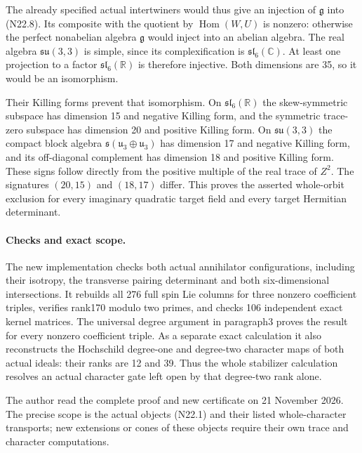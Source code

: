 The already specified actual intertwiners would thus give an
injection of $\mathfrak g$ into (N22.8). Its composite with
the quotient by $\operatorname{Hom}(W,U)$ is nonzero: otherwise
the perfect nonabelian algebra $\mathfrak g$ would inject into
an abelian algebra. The real algebra $\mathfrak{su}(3,3)$ is
simple, since its complexification is $\mathfrak{sl}_6(\mathbb C)$.
At least one projection to a factor $\mathfrak{sl}_6(\mathbb R)$
is therefore injective. Both dimensions are 35, so it would be
an isomorphism.

Their Killing forms prevent that isomorphism. On
$\mathfrak{sl}_6(\mathbb R)$ the skew-symmetric subspace has
dimension 15 and negative Killing form, and the symmetric
trace-zero subspace has dimension 20 and positive Killing form.
On $\mathfrak{su}(3,3)$ the compact block algebra
$\mathfrak s(\mathfrak u_3\oplus\mathfrak u_3)$ has dimension
17 and negative Killing form, and its off-diagonal complement
has dimension 18 and positive Killing form. These signs follow
directly from the positive multiple of the real trace of $Z^2$.
The signatures $(20,15)$ and $(18,17)$ differ. This proves
the asserted whole-orbit exclusion for every imaginary quadratic
target field and every target Hermitian determinant.

\paragraph{Checks and exact scope.}
The new implementation
checks both actual annihilator configurations, including their
isotropy, the transverse pairing determinant and both
six-dimensional intersections. It rebuilds all 276 full spin
Lie columns for three nonzero coefficient triples, verifies
rank170 modulo two primes, and checks 106 independent exact
kernel matrices. The universal degree argument in paragraph3
proves the result for every nonzero coefficient triple.
As a separate exact calculation it also reconstructs the
Hochschild degree-one and degree-two character maps of both
actual ideals: their ranks are 12 and 39. Thus the whole
stabilizer calculation resolves an actual character gate left
open by that degree-two rank alone.

The author read the complete proof and new certificate on
21 November 2026. The precise scope is the actual objects
(N22.1) and their listed whole-character transports; new
extensions or cones of these objects require their own trace
and character computations.
